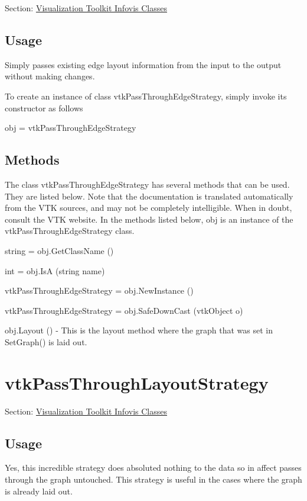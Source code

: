 Section\-: \hyperlink{sec_vtkinfovis}{Visualization Toolkit Infovis Classes} \hypertarget{vtkwidgets_vtkxyplotwidget_Usage}{}\subsection{Usage}\label{vtkwidgets_vtkxyplotwidget_Usage}
Simply passes existing edge layout information from the input to the output without making changes.

To create an instance of class vtk\-Pass\-Through\-Edge\-Strategy, simply invoke its constructor as follows \begin{DoxyVerb}  obj = vtkPassThroughEdgeStrategy
\end{DoxyVerb}
 \hypertarget{vtkwidgets_vtkxyplotwidget_Methods}{}\subsection{Methods}\label{vtkwidgets_vtkxyplotwidget_Methods}
The class vtk\-Pass\-Through\-Edge\-Strategy has several methods that can be used. They are listed below. Note that the documentation is translated automatically from the V\-T\-K sources, and may not be completely intelligible. When in doubt, consult the V\-T\-K website. In the methods listed below, {\ttfamily obj} is an instance of the vtk\-Pass\-Through\-Edge\-Strategy class. 
\begin{DoxyItemize}
\item {\ttfamily string = obj.\-Get\-Class\-Name ()}  
\item {\ttfamily int = obj.\-Is\-A (string name)}  
\item {\ttfamily vtk\-Pass\-Through\-Edge\-Strategy = obj.\-New\-Instance ()}  
\item {\ttfamily vtk\-Pass\-Through\-Edge\-Strategy = obj.\-Safe\-Down\-Cast (vtk\-Object o)}  
\item {\ttfamily obj.\-Layout ()} -\/ This is the layout method where the graph that was set in Set\-Graph() is laid out.  
\end{DoxyItemize}\hypertarget{vtkinfovis_vtkpassthroughlayoutstrategy}{}\section{vtk\-Pass\-Through\-Layout\-Strategy}\label{vtkinfovis_vtkpassthroughlayoutstrategy}
Section\-: \hyperlink{sec_vtkinfovis}{Visualization Toolkit Infovis Classes} \hypertarget{vtkwidgets_vtkxyplotwidget_Usage}{}\subsection{Usage}\label{vtkwidgets_vtkxyplotwidget_Usage}
Yes, this incredible strategy does absoluted nothing to the data so in affect passes through the graph untouched. This strategy is useful in the cases where the graph is already laid out.

